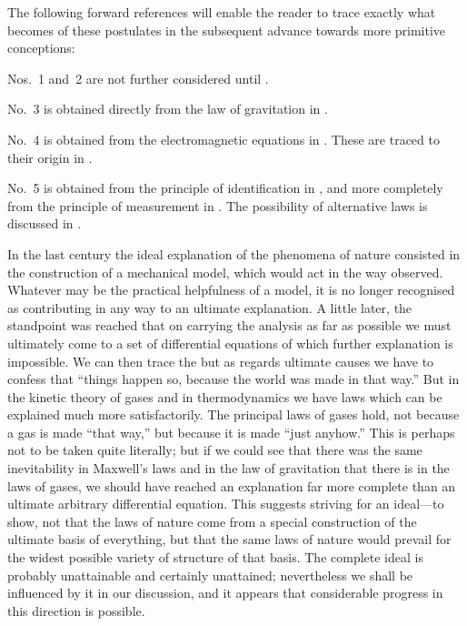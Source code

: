 \documentclass[12pt]{book}
\begin{document}
The following forward references will enable the reader to trace exactly
what becomes of these postulates in the subsequent advance towards more
primitive conceptions:

Nos.~1 and~2 are not further considered until .

No.~3 is obtained directly from the law of gravitation in .

No.~4 is obtained from the electromagnetic equations in . These are
traced to their origin in .

No.~5 is obtained from the principle of identification in , and more
completely from the principle of measurement in . The possibility of
alternative laws is discussed in .

In the last century the ideal explanation of the phenomena of nature consisted
%
in the construction of a mechanical model, which would act in the way
observed. Whatever may be the practical helpfulness of a model, it is no
longer recognised as contributing in any way to an ultimate explanation. A
little later, the standpoint was reached that on carrying the analysis as far as
possible we must ultimately come to a set of differential equations of which
further explanation is impossible. We can then trace the  but
as regards ultimate causes we have to confess that ``things happen so, because
the world was made in that way.'' But in the kinetic theory of gases and in
thermodynamics we have laws which can be explained much more satisfactorily.
The principal laws of gases hold, not because a gas is made ``that way,'' but
because it is made ``just anyhow.'' This is perhaps not to be taken quite
literally; but if we could see that there was the same inevitability in Maxwell's
laws and in the law of gravitation that there is in the laws of gases, we
should have reached an explanation far more complete than an ultimate arbitrary
differential equation. This suggests striving for an ideal---to show, not
that the laws of nature come from a special construction of the ultimate basis
of everything, but that the same laws of nature would prevail for the widest
possible variety of structure of that basis. The complete ideal is probably
unattainable and certainly unattained; nevertheless we shall be influenced
by it in our discussion, and it appears that considerable progress in this
direction is possible.

\end{document}
